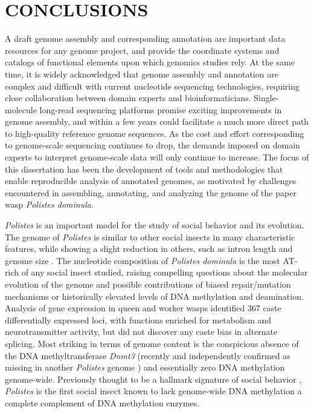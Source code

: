 \chapter{CONCLUSIONS}

A draft genome assembly and corresponding annotation are important data resources for any genome project, and provide the coordinate systems and catalogs of functional elements upon which genomics studies rely.
At the same time, it is widely acknowledged that genome assembly and annotation are complex and difficult with current nucleotide sequencing technologies, requiring close collaboration between domain experts and bioinformaticians.
Single-molecule long-read sequencing platforms promise exciting improvements in genome assembly, and within a few years could facilitate a much more direct path to high-quality reference genome sequences.
As the cost and effort corresponding to genome-scale sequencing continues to drop, the demands imposed on domain experts to interpret genome-scale data will only continue to increase.
The focus of this dissertation has been the development of tools and methodologies that enable reproducible analysis of annotated genomes, as motivated by challenges encountered in assembling, annotating, and analyzing the genome of the paper wasp \textit{Polistes dominula}.

\textit{Polistes} is an important model for the study of social behavior and its evolution.
The genome of \textit{Polistes} is similar to other social insects in many characteristic features, while showing a slight reduction in others, such as intron length and genome size \cite{PdomGenome}.
The nucleotide composition of \textit{Polistes dominula} is the most AT-rich of any social insect studied, raising compelling questions about the molecular evolution of the genome and possible contributions of biased repair/mutation mechanisms or historically elevated levels of DNA methylation and deamination.
Analysis of gene expression in queen and worker wasps identified 367 caste differentially expressed loci, with functions enriched for metabolism and neurotransmitter activity, but did not discover any caste bias in alternate splicing.
Most striking in terms of genome content is the conspicious absence of the DNA methyltransferase \textit{Dnmt3} (recently and independently confirmed as missing in another \textit{Polistes} genome \cite{PcanGenome}) and essentially zero DNA methylation genome-wide.
Previously thought to be a hallmark signature of social behavior \cite{Glastad2011}, \textit{Polistes} is the first social insect known to lack genome-wide DNA methylation a complete complement of DNA methylation enzymes.

